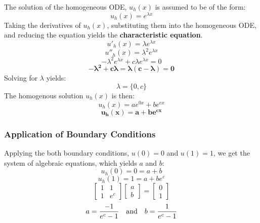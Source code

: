 \documentclass[10pt]{article}		%
\numberwithin{equation}{section}
\begin{document}
The solution of the homogeneous ODE, $u_h(x)$ is assumed to be of the form: 
\begin{equation}
u_h(x) = e^{\lambda x}
\end{equation}
Taking the derivatives of $u_h(x)$, substituting them into the homogeneous ODE, and reducing the equation yields the \textbf{characteristic equation}.
\begin{equation}
u'_h(x) = \lambda e^{\lambda x}
\end{equation}
\begin{equation}
u''_h(x) = \lambda^2 e^{\lambda x}
\end{equation}
\begin{equation}
-\lambda^2 e^{\lambda x} + c \lambda e^{\lambda x} = 0
\end{equation}
\begin{equation}
\mathbf{-\lambda^2 + c \lambda = \lambda(c-\lambda) = 0}
\end{equation}
Solving for $\lambda$ yields:
\begin{equation}
\lambda = \{0, c\}
\end{equation}
The homogenous solution $u_h(x)$ is then:
\begin{equation}
u_h(x) = ae^{0x} + be^{cx} 
\end{equation}
\begin{equation}
\mathbf{u_h(x) = a + be^{cx}}
\end{equation}

\subsubsection{Application of Boundary Conditions}

Applying the both boundary conditions, $u(0) = 0$ and $u(1) = 1$, we get the system of algebraic equations, which yields $a$ and $b$:
\begin{equation}
u_h(0) = 0 = a + b
\end{equation}
\begin{equation}
u_h(1) = 1 = a + be^c
\end{equation}
\begin{equation}
	\begin{bmatrix}
		1 & 1 \\ 1 & e^c
	\end{bmatrix}
	\begin{bmatrix}
	a \\ b
	\end{bmatrix}
	=
	\begin{bmatrix}
	0 \\ 1
	\end{bmatrix}
\end{equation}
\begin{equation}
a = \frac{-1}{e^c-1} \quad \textnormal{and} \quad b = \frac{1}{e^c-1}
\end{equation}
\end{document}
